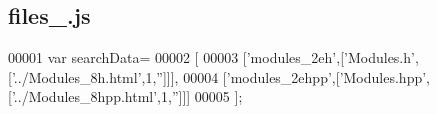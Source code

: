 \subsection{files\+\_.\+js}
\label{files__5_8js_source}

\begin{DoxyCode}
00001 var searchData=
00002 [
00003   [\textcolor{stringliteral}{'modules\_2eh'},[\textcolor{stringliteral}{'Modules.h'},[\textcolor{stringliteral}{'../Modules\_8h.html'},1,\textcolor{stringliteral}{''}]]],
00004   [\textcolor{stringliteral}{'modules\_2ehpp'},[\textcolor{stringliteral}{'Modules.hpp'},[\textcolor{stringliteral}{'../Modules\_8hpp.html'},1,\textcolor{stringliteral}{''}]]]
00005 ];
\end{DoxyCode}
